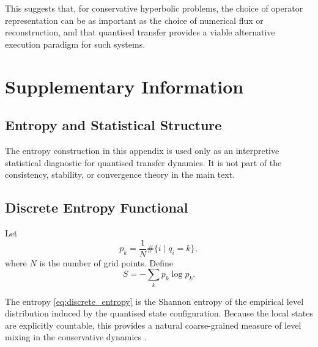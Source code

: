 \documentclass[sn-basic]{sn-jnl}
\theoremstyle{plain}
\theoremstyle{remark}
\begin{document}
This suggests that, for conservative hyperbolic problems, the choice of operator representation can be as important as the choice of numerical flux or reconstruction, and that quantised transfer provides a viable alternative execution paradigm for such systems.




\newpage
\section*{Supplementary Information}
\label{sec:si}
\setcounter{theorem}{0}
\renewcommand{\thetheorem}{S\arabic{theorem}}
\subsection*{Entropy and Statistical Structure}
\label{app:entropy}
The entropy construction in this appendix is used only as an interpretive statistical diagnostic for quantised transfer dynamics. It is not part of the consistency, stability, or convergence theory in the main text.

\subsection*{Discrete Entropy Functional}
\label{subsec:entropy_functional}

Let
\begin{equation}
p_k = \frac{1}{N} \#\{ i \mid q_i = k \},
\label{eq:pk_definition}
\end{equation}
where $N$ is the number of grid points. Define
\begin{equation}
S = - \sum_k p_k \log p_k.
\label{eq:discrete_entropy}
\end{equation}

The entropy \cref{eq:discrete_entropy} is the Shannon entropy of the empirical level distribution induced by the quantised state configuration. Because the local states are explicitly countable, this provides a natural coarse-grained measure of level mixing in the conservative dynamics \cite{shannonMathematicalTheoryCommunication1948,jaynesInformationTheoryStatistical1957,coverElementsInformationTheory2006}.
\end{document}
